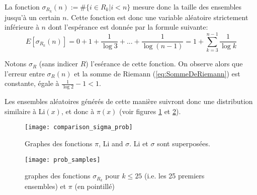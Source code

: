 \documentclass[../main.tex]{report}
\begin{document}
La fonction $\sigma_{R_k}(n) := \# \{i \in R_{k} | i < n\}$ mesure donc la taille des ensembles jusqu'à un certain $n$. 
Cette fonction est donc une variable aléatoire strictement inférieure à $n$ dont l'espérance est donnée par la formule suivante:
\begin{equation}
\label{eq:esperance}
E[\sigma_{R_k}(n)] = 0 + 1 + \frac{1}{\log 3} + ... + \frac{1}{\log (n-1)}
= 1 + \sum_{k=3}^{n-1} \frac{1}{\log k}
\end{equation}

Notons $\sigma_R$ (sans indicer $R$) l'esérance de cette fonction.
On observe alors que l'erreur entre $\sigma_R(n)$ et la somme de Riemann (\ref{eq:SommeDeRiemann}) est constante, égale à
$\frac{1}{\log 2}- 1 < 1$.

Les ensembles aléatoires générés de cette manière suivront donc une distribution similaire à Li$(x)$, et donc à $\pi(x)$
(voir figures \ref{fig:comparison_sigma_prob} et \ref{fig:prob_sample}).

\begin{figure}[H]
\texttt{[image: comparison\_sigma\_prob]}

\caption{Graphes des fonctions $\pi$, Li and $\sigma$. Li et $\sigma$ sont superposées.}
\label{fig:comparison_sigma_prob}
\end{figure}

\begin{figure}[H]
	\centering
	\texttt{[image: prob\_samples]}
	\caption{graphes des fonctions $\sigma_{R_k}$ pour $k \leq 25$ (i.e. les 25 premiers ensembles) et $\pi$ (en pointillé)}
	\label{fig:prob_sample}
\end{figure}
\end{document}
